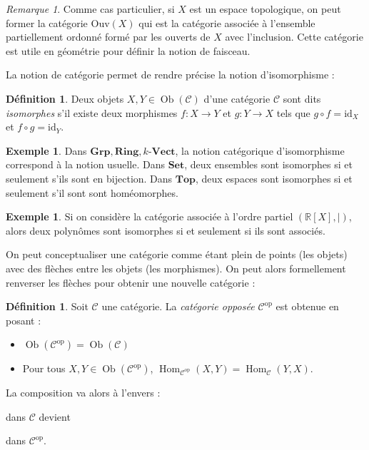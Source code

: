 \documentclass{article}
\newcommand{\id}{\mathrm{id}}
\newcommand{\op}{\mathrm{op}}
\newcommand{\R}{\mathbb{R}}
\newcommand{\cat}{\mathcal{C}}
\newcommand{\Set}{\mathbf{Set}}
\newcommand{\Top}{\mathbf{Top}}
\newcommand{\Grp}{\mathbf{Grp}}
\newcommand{\Vectcat}{\mathbf{Vect}}
\newcommand{\Ring}{\mathbf{Ring}}
\DeclareMathOperator{\Ob}{Ob}
\DeclareMathOperator{\Hom}{Hom}
\theoremstyle{plain}
\theoremstyle{definition}
\newtheorem{definition}[theorem]{Définition}
\newtheorem{example}[theorem]{Exemple}
\theoremstyle{remark}
\newtheorem*{remark}{Remarque}
\begin{document}
\begin{remark}
    Comme cas particulier, si $X$ est un espace topologique, on peut former la catégorie $\mathrm{Ouv}(X)$ qui est la catégorie associée à l'ensemble partiellement ordonné formé par les ouverts de $X$ avec l'inclusion. Cette catégorie est utile en géométrie pour définir la notion de faisceau.
\end{remark}

La notion de catégorie permet de rendre précise la notion d'isomorphisme :

\begin{definition}
    Deux objets $X,Y \in \Ob(\cat)$ d'une catégorie $\cat$ sont dits \emph{isomorphes} s'il existe deux morphismes $f : X \to Y$ et $g : Y \to X$ tels que $g \circ f = \id_X$ et $f \circ g = \id_Y$.
\end{definition}

\begin{example}
    Dans $\Grp,\Ring,k\text{-}\Vectcat$, la notion catégorique d'isomorphisme correspond à la notion usuelle. Dans $\Set$, deux ensembles sont isomorphes si et seulement s'ils sont en bijection. Dans $\Top$, deux espaces sont isomorphes si et seulement s'il sont sont homéomorphes.
\end{example}

\begin{example}
    Si on considère la catégorie associée à l'ordre partiel $(\R[X],\mid)$, alors deux polynômes sont isomorphes si et seulement si ils sont associés.
\end{example}

On peut conceptualiser une catégorie comme étant plein de points (les objets) avec des flèches entre les objets (les morphismes). On peut alors formellement renverser les flèches pour obtenir une nouvelle catégorie :

\begin{definition}
    Soit $\cat$ une catégorie. La \emph{catégorie opposée $\cat^\op$} est obtenue en posant :
    \begin{itemize}
        \item $\Ob(\cat^\op) = \Ob(\cat)$
        \item Pour tous $X,Y \in \Ob(\cat^\op)$, $\Hom_{\cat^\op}(X,Y) = \Hom_{\cat} (Y,X)$.
    \end{itemize} 
    La composition va alors à l'envers : 
    dans $\cat$ devient
    dans $\cat^\op$.
\end{definition}
\end{document}
